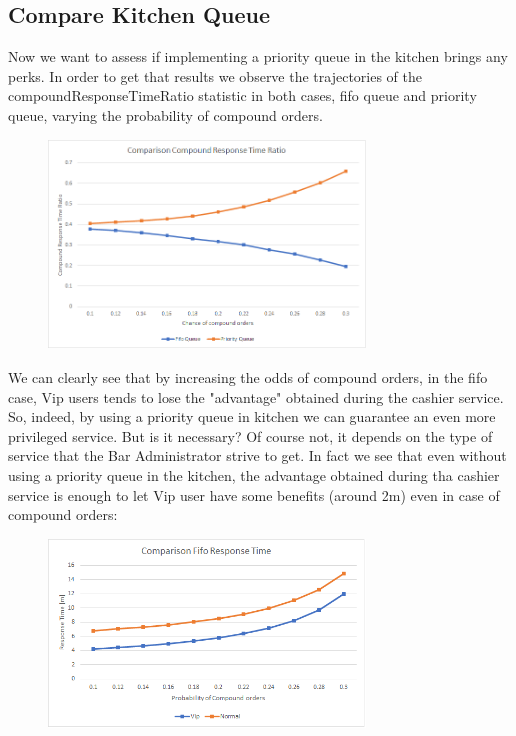 \subsection{Compare Kitchen Queue}

Now we want to assess if implementing a priority queue in the kitchen brings any perks. In order to get that results we observe the trajectories of the compoundResponseTimeRatio statistic in both cases, fifo queue and priority queue, varying the probability of compound orders.

\begin{figure}[H]
    \centering
    \includegraphics[width=0.75\textwidth]{figs/comparisonQueue.png}
\end{figure}

We can clearly see that by increasing the odds of compound orders, in the fifo case, Vip users tends to lose the "advantage" obtained during the cashier service. So, indeed, by using a priority queue in kitchen we can guarantee an even more privileged service. But is it necessary? Of course not, it depends on the type of service that the Bar Administrator strive to get. In fact we see that even without using a priority queue in the kitchen, the advantage obtained during tha cashier service is enough to let Vip user have some benefits (around 2m) even in case of compound orders:

\begin{figure}[H]
    \centering
    \includegraphics[width=0.75\textwidth]{figs/comparisonFifoKitchen.png}
\end{figure}


